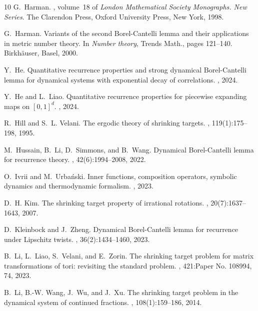 \documentclass[11pt,reqno]{amsart}
\newcommand{\0}{\mathbf{0}}
\theoremstyle{remark}
\numberwithin{equation}{section}
\theoremstyle{remark}
\numberwithin{equation}{section}
\begin{document}
\begin{thebibliography}{10}
G.~Harman.
, volume~18 of {\em London Mathematical
  Society Monographs. New Series}.
\newblock The Clarendon Press, Oxford University Press, New York, 1998.

G.~Harman.
\newblock Variants of the second {B}orel-{C}antelli lemma and their
  applications in metric number theory.
\newblock In {\em Number theory}, Trends Math., pages 121--140. Birkh\"auser,
  Basel, 2000.

Y.~He.
\newblock Quantitative recurrence properties and strong dynamical
  $\mathrm{B}$orel-$\mathrm{C}$antelli lemma for dynamical systems with
  exponential decay of correlations.
, 2024.

Y.~He and L.~Liao.
\newblock Quantitative recurrence properties for piecewise expanding maps on
  $[0, 1]^{d}$.
, 2024.

R.~Hill and S.~L. Velani.
\newblock The ergodic theory of shrinking targets.
, 119(1):175--198, 1995.

M.~Hussain, B.~Li, D.~Simmons, and B.~Wang.
\newblock Dynamical {B}orel-{C}antelli lemma for recurrence theory.
, 42(6):1994--2008, 2022.

O.~Ivrii and M.~Urbański.
\newblock Inner functions, composition operators, symbolic dynamics and
  thermodynamic formalism.
, 2023.

D.~H. Kim.
\newblock The shrinking target property of irrational rotations.
, 20(7):1637--1643, 2007.

D.~Kleinbock and J.~Zheng.
\newblock Dynamical {B}orel-{C}antelli lemma for recurrence under {L}ipschitz
  twists.
, 36(2):1434--1460, 2023.

B.~Li, L.~Liao, S.~Velani, and E.~Zorin.
\newblock The shrinking target problem for matrix transformations of tori:
  revisiting the standard problem.
, 421:Paper No. 108994, 74, 2023.

B.~Li, B.-W. Wang, J.~Wu, and J.~Xu.
\newblock The shrinking target problem in the dynamical system of continued
  fractions.
, 108(1):159--186, 2014.


\end{thebibliography}
\end{document}
